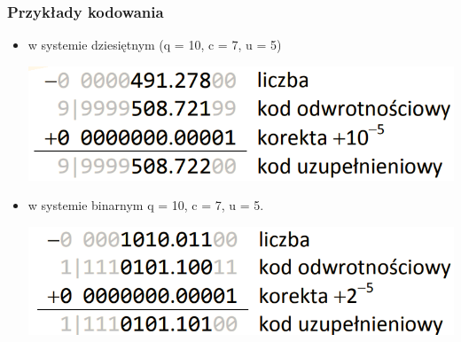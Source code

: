 \documentclass[12pt]{article}
\begin{document}
    \subsubsection{Przykłady kodowania}
    \begin{itemize}
        \item w systemie dziesiętnym (q = 10, c = 7, u = 5)
        \begin{center}
            \includegraphics[scale=0.4]{graphics/number-repr/uzp-encode-dec.png}

        \end{center}
        \item w systemie binarnym q = 10, c = 7, u = 5.
        \begin{center}
            \includegraphics[scale=0.4]{graphics/number-repr/uzp-encode-bin.png}
        \end{center}
            
    \end{itemize}
    
\end{document}
